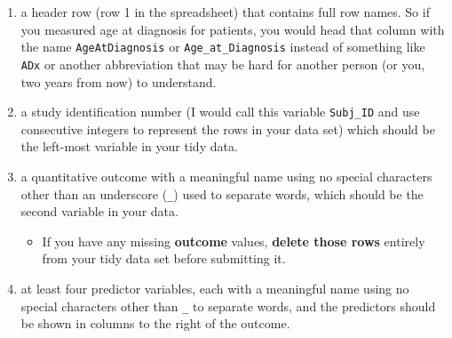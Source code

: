 \documentclass[]{book}
\providecommand{\tightlist}{%
  \setlength{\itemsep}{0pt}\setlength{\parskip}{0pt}}
\theoremstyle{definition}
\theoremstyle{definition}
\theoremstyle{definition}
\theoremstyle{remark}
\begin{document}
\begin{enumerate}
\def\labelenumi{\arabic{enumi}.}
\tightlist
\item
  a header row (row 1 in the spreadsheet) that contains full row names.
  So if you measured age at diagnosis for patients, you would head that
  column with the name \texttt{AgeAtDiagnosis} or
  \texttt{Age\_at\_Diagnosis} instead of something like \texttt{ADx} or
  another abbreviation that may be hard for another person (or you, two
  years from now) to understand.
\item
  a study identification number (I would call this variable
  \texttt{Subj\_ID} and use consecutive integers to represent the rows
  in your data set) which should be the left-most variable in your tidy
  data.
\item
  a quantitative outcome with a meaningful name using no special
  characters other than an underscore (\texttt{\_}) used to separate
  words, which should be the second variable in your data.

  \begin{itemize}
  \tightlist
  \item
    If you have any missing \textbf{outcome} values, \textbf{delete
    those rows} entirely from your tidy data set before submitting it.
  \end{itemize}
\item
  at least four predictor variables, each with a meaningful name using
  no special characters other than \texttt{\_} to separate words, and
  the predictors should be shown in columns to the right of the outcome.


\end{enumerate}
\end{document}
